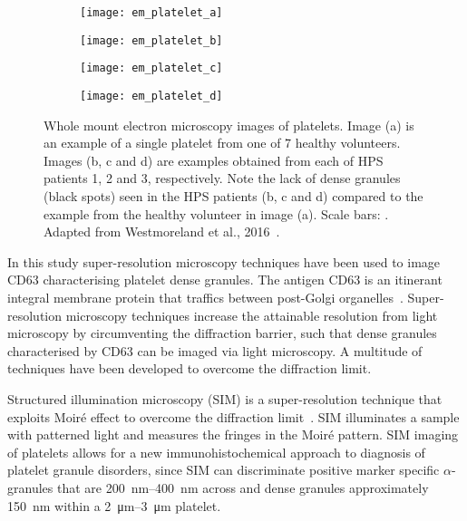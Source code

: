 \begin{figure}[htbp]\centering
	\begin{subfigure}[b]{0.245\linewidth}
		\centering
		\texttt{[image: em\_platelet\_a]}
		\caption{}
		\label{figure:introduction:em_platelet_a}
		\vspace{1ex}
	\end{subfigure}
	\begin{subfigure}[b]{0.245\linewidth}
		\centering
		\texttt{[image: em\_platelet\_b]}
		\caption{}
		\label{figure:introduction:em_platelet_b}
		\vspace{1ex}
	\end{subfigure}
	\begin{subfigure}[b]{0.245\linewidth}
		\centering
		\texttt{[image: em\_platelet\_c]}
		\caption{}
		\label{figure:introduction:em_platelet_c}
		\vspace{1ex}
	\end{subfigure}
	\begin{subfigure}[b]{0.245\linewidth}
		\centering
		\texttt{[image: em\_platelet\_d]}
		\caption{}
		\label{figure:introduction:em_platelet_d}
		\vspace{1ex}
	\end{subfigure}
\caption[Whole mount electron microscopy images of platelets]{Whole mount electron microscopy images of platelets. Image (a) is an example of a single platelet from one of 7 healthy volunteers. Images (b, c and d) are examples obtained from each of HPS patients 1, 2 and 3, respectively. Note the lack of dense granules (black spots) seen in the HPS patients (b, c and d) compared to the example from the healthy volunteer in image (a). Scale bars: . Adapted from Westmoreland et al., 2016~\cite{Westmoreland2016}.}
\label{figure:introduction:em_platelet}
\end{figure}

In this study super-resolution microscopy techniques have been used to image CD63 characterising platelet dense granules. The antigen CD63 is an itinerant integral membrane protein that traffics between post-Golgi organelles~\cite{Pols2009}. Super-resolution microscopy techniques increase the attainable resolution from light microscopy by circumventing the diffraction barrier, such that dense granules characterised by CD63 can be imaged via light microscopy. A multitude of techniques have been developed to overcome the diffraction limit.

Structured illumination microscopy (SIM) is a super-resolution technique that exploits Moir\'e effect to overcome the diffraction limit~\cite{Gustafsson2005}. SIM illuminates a sample with patterned light and measures the fringes in the Moir\'e pattern. SIM imaging of platelets allows for a new immunohistochemical approach to diagnosis of platelet granule disorders, since SIM can discriminate positive marker specific $\alpha$-granules that are \SIrange{200}{400}{\nano\meter} across and dense granules approximately \SI{150}{\nano\meter} within a \SIrange{2}{3}{\micro\meter} platelet.

